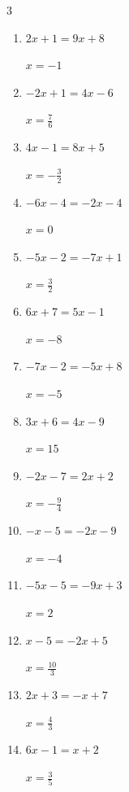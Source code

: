 \begin{multicols}{3}
\begin{enumerate}
        $\displaystyle x=-\frac{9}{10}$

  \item $2x+1=9x+8$

        $\displaystyle x=-1$

\columnbreak %

  \item $-2x+1=4x-6$

        $\displaystyle x=\frac{7}{6}$

  \item $4x-1=8x+5$

        $\displaystyle x=-\frac{3}{2}$

  \item $-6x-4=-2x-4$

        $\displaystyle x=0$

  \item $-5x-2=-7x+1$

        $\displaystyle x=\frac{3}{2}$

  \item $6x+7=5x-1$

        $\displaystyle x=-8$

  \item $-7x-2=-5x+8$

        $\displaystyle x=-5$

  \item $3x+6=4x-9$

        $\displaystyle x=15$

  \item $-2x-7=2x+2$

        $\displaystyle x=-\frac{9}{4}$

  \item $-x-5=-2x-9$

        $\displaystyle x=-4$

  \item $-5x-5=-9x+3$

        $\displaystyle x=2$

  \item $x-5=-2x+5$

        $\displaystyle x=\frac{10}{3}$

  \item $2x+3=-x+7$

        $\displaystyle x=\frac{4}{3}$

  \item $6x-1=x+2$

        $\displaystyle x=\frac{3}{5}$


\end{enumerate}
\end{multicols}
